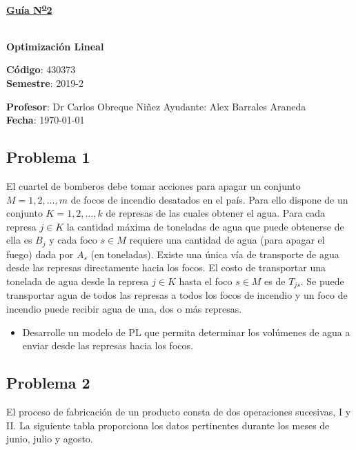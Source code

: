 \documentclass[letterpaper]{article}
\begin{document}
\vspace*{0.5\baselineskip}
\begin{center}
\begin{Large}
\textbf{\underline{Guía N\textsuperscript{\underline{o}}2}}
\end{Large}\\
\vspace*{0.5\baselineskip}
\textbf{Optimización Lineal} \\
\vspace*{0.5\baselineskip}
\begin{footnotesize}
\textbf{Código}: 430373\\
\textbf{Semestre}: 2019-2
\end{footnotesize}
\end{center}

\noindent \textbf{Profesor}: Dr Carlos Obreque Niñez  \hfill Ayudante: Alex Barrales Araneda\\
\noindent \textbf{Fecha}: \today

\subsection*{Problema 1}
El cuartel de bomberos debe tomar acciones para apagar un conjunto $M = 1,2,\dots,m$ de focos de incendio desatados en el país. Para ello dispone de un conjunto $K = 1,2,\dots,k$ de represas de las cuales obtener el agua. Para cada represa $j \in K$ la cantidad máxima de toneladas de agua que puede obtenerse de ella es $B_j$ y cada foco $s \in M$ requiere una cantidad de agua (para apagar el fuego) dada por $A_s$ (en toneladas). Existe una única vía de transporte de agua desde las represas directamente hacia los focos. El costo de transportar una tonelada de agua desde la represa $j \in K$ hasta el foco $s \in M$ es de $T_{js}$. Se puede transportar agua de todos las represas a todos los focos de incendio y un foco de incendio puede recibir agua de una, dos o más represas.

\begin{itemize}
\item Desarrolle un modelo de PL que permita determinar los volúmenes de agua a enviar desde las represas hacia los focos.
\end{itemize}

\subsection*{Problema 2}
El proceso de fabricación de un producto consta de dos operaciones sucesivas, I y II. La siguiente tabla proporciona los datos pertinentes durante los meses de junio, julio y agosto.
\end{document}

